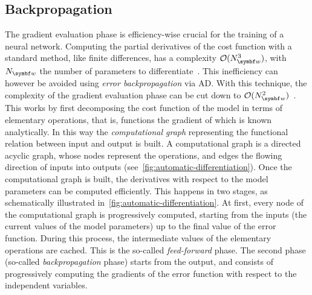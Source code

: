 

\subsection{Backpropagation}
\label{subsec:GL:backpropagation}

The gradient evaluation phase is efficiency-wise crucial for the training of a neural network.
Computing the partial derivatives of the cost function with a standard method, like finite differences, has a complexity $\mathcal O(N_{\bs w}^3)$, with $N_{\bs w}$ the number of parameters to differentiate~\cite{bishop2006pattern}.
This inefficiency can however be avoided using \emph{error backpropagation} via \ac{AD}.
With this technique, the complexity of the gradient evaluation phase can be cut down to $\mathcal O(N_{\bs w}^2)$~\cite{bishop2006pattern}.
This works by first decomposing the cost function of the model in terms of elementary operations, that is, functions the gradient of which is known analytically.
In this way the \emph{computational graph} representing the functional relation between input and output is built.
A computational graph is a directed acyclic graph, whose nodes represent the operations, and edges the flowing direction of inputs into outputs (see~\cref{fig:automatic-differentiation}).
Once the computational graph is built, the derivatives with respect to the model parameters can be computed efficiently.
This happens in two stages, as schematically illustrated in~\cref{fig:automatic-differentiation}.
At first, every node of the computational graph is progressively computed, starting from the inputs (the current values of the model parameters) up to the final value of the error function.
During this process, the intermediate values of the elementary operations are cached.
This is the so-called \emph{feed-forward} phase.
The second phase (so-called \emph{backpropagation} phase) starts from the output, and consists of progressively computing the gradients of the error function with respect to the independent variables.

